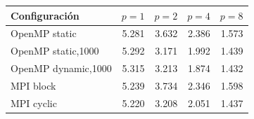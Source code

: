 \begin{tabular}{lrrrr}
\toprule
Configuraci\'on & $p=1$ & $p=2$ & $p=4$ & $p=8$ \\
\midrule
OpenMP static & 5.281 & 3.632 & 2.386 & 1.573 \\
OpenMP static,1000 & 5.292 & 3.171 & 1.992 & 1.439 \\
OpenMP dynamic,1000 & 5.315 & 3.213 & 1.874 & 1.432 \\
MPI block & 5.239 & 3.734 & 2.346 & 1.598 \\
MPI cyclic & 5.220 & 3.208 & 2.051 & 1.437 \\
\bottomrule
\end{tabular}